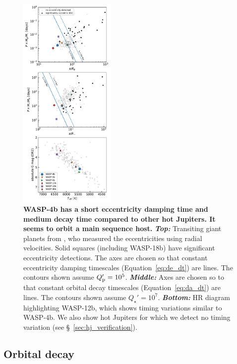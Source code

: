 \documentclass[12pt,twocolumn,tighten]{aastex62}
\begin{document}
\begin{figure}[t!]
  \begin{center}
    \includegraphics[width=0.415\textwidth]{f4.pdf}
  \end{center}
  \vspace{-0.5cm}
  \caption{
    {\bf WASP-4b has a short eccentricity
    	damping time and medium decay time compared to other hot Jupiters.
    	It seems to orbit a main sequence host.
    }
    {\bf \it Top:}
    Transiting giant planets from \citet{bonomo_gaps_2017}, who
    measured the eccentricities using radial velocities.  Solid
    squares (including WASP-18b) have significant eccentricity
    detections.  The axes are chosen so that constant eccentricity
    damping timescales (Equation~\ref{eq:de_dt}) are lines.  The
    contours shown assume $Q_{\rm p}' = 10^5$.
    {\bf \it Middle:} 
    Axes are chosen so to that constant orbital decay timescales
    (Equation~\ref{eq:da_dt}) are lines.  The contours shown assume
    $Q_\star' = 10^7$.
    {\bf \it Bottom:}
    HR diagram highlighting WASP-12b, which shows timing variations
    similar to WASP-4b.  We also show hot Jupiters for which we
    detect no timing variation (see \S~\ref{sec:hj_verification}).
    \label{fig:context}
  }
\end{figure}

 
\subsection{Orbital decay}
\end{document}
